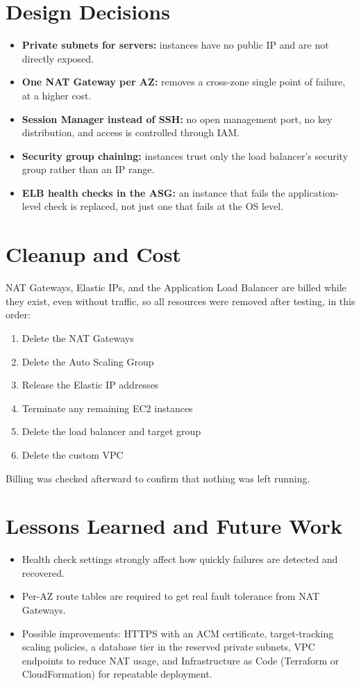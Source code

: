 \documentclass[11pt,a4paper]{article}
\begin{document}
\section{Design Decisions}
\begin{itemize}
  \item \textbf{Private subnets for servers:} instances have no public IP and are not directly exposed.
  \item \textbf{One NAT Gateway per AZ:} removes a cross-zone single point of failure, at a higher cost.
  \item \textbf{Session Manager instead of SSH:} no open management port, no key distribution, and access is controlled through IAM.
  \item \textbf{Security group chaining:} instances trust only the load balancer's security group rather than an IP range.
  \item \textbf{ELB health checks in the ASG:} an instance that fails the application-level check is replaced, not just one that fails at the OS level.
\end{itemize}

\newpage
\section{Cleanup and Cost}
NAT Gateways, Elastic IPs, and the Application Load Balancer are billed while they exist, even without traffic, so all resources were removed after testing, in this order:
\begin{enumerate}
  \item Delete the NAT Gateways
  \item Delete the Auto Scaling Group
  \item Release the Elastic IP addresses
  \item Terminate any remaining EC2 instances
  \item Delete the load balancer and target group
  \item Delete the custom VPC
\end{enumerate}
Billing was checked afterward to confirm that nothing was left running.

\section{Lessons Learned and Future Work}
\begin{itemize}
  \item Health check settings strongly affect how quickly failures are detected and recovered.
  \item Per-AZ route tables are required to get real fault tolerance from NAT Gateways.
  \item Possible improvements: HTTPS with an ACM certificate, target-tracking scaling policies, a database tier in the reserved private subnets, VPC endpoints to reduce NAT usage, and Infrastructure as Code (Terraform or CloudFormation) for repeatable deployment.
\end{itemize}
\end{document}
